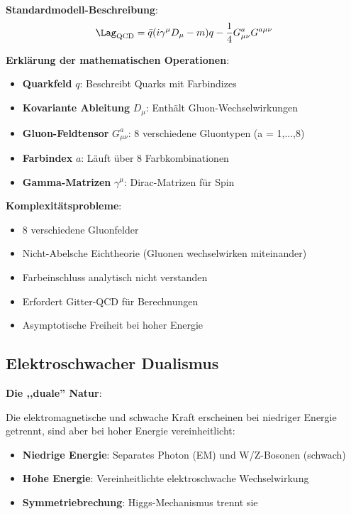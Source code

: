 	\textbf{Standardmodell-Beschreibung}:
	\begin{equation}
		\Lag_{\text{QCD}} = \bar{q} (i\gamma^\mu D_\mu - m) q - \frac{1}{4} G_{\mu\nu}^a G^{a\mu\nu}
	\end{equation}
	
	\textbf{Erklärung der mathematischen Operationen}:
	\begin{itemize}
		\item \textbf{Quarkfeld} $q$: Beschreibt Quarks mit Farbindizes
		\item \textbf{Kovariante Ableitung} $D_\mu$: Enthält Gluon-Wechselwirkungen
		\item \textbf{Gluon-Feldtensor} $G_{\mu\nu}^a$: 8 verschiedene Gluontypen (a = 1,...,8)
		\item \textbf{Farbindex} $a$: Läuft über 8 Farbkombinationen
		\item \textbf{Gamma-Matrizen} $\gamma^\mu$: Dirac-Matrizen für Spin
	\end{itemize}
	
	\textbf{Komplexitätsprobleme}:
	\begin{itemize}
		\item 8 verschiedene Gluonfelder
		\item Nicht-Abelsche Eichtheorie (Gluonen wechselwirken miteinander)
		\item Farbeinschluss analytisch nicht verstanden
		\item Erfordert Gitter-QCD für Berechnungen
		\item Asymptotische Freiheit bei hoher Energie
	\end{itemize}
	
	\subsection{Elektroschwacher Dualismus}
	
	\textbf{Die ,,duale'' Natur}:
	
	Die elektromagnetische und schwache Kraft erscheinen bei niedriger Energie getrennt, sind aber bei hoher Energie vereinheitlicht:
	
	\begin{itemize}
		\item \textbf{Niedrige Energie}: Separates Photon (EM) und W/Z-Bosonen (schwach)
		\item \textbf{Hohe Energie}: Vereinheitlichte elektroschwache Wechselwirkung
		\item \textbf{Symmetriebrechung}: Higgs-Mechanismus trennt sie
	\end{itemize}
	
